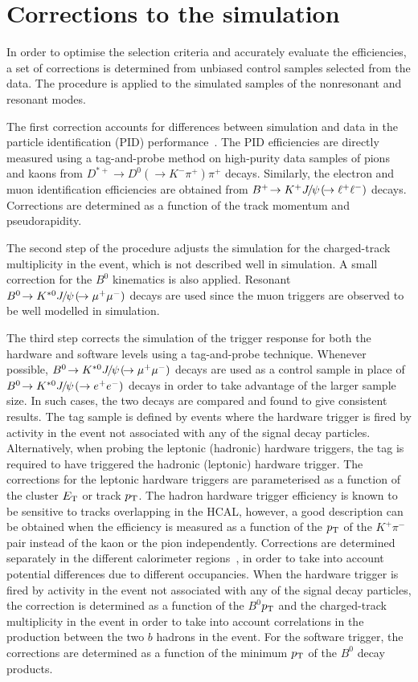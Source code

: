 \documentclass[12pt,a4paper]{article}
\def\Ppi         {\ensuremath{\uppi}\xspace}
\def\Ppsi        {\ensuremath{\uppsi}\xspace}
\def\PB      {\ensuremath{\mathrm{B}}\xspace}
\def\PD      {\ensuremath{\mathrm{D}}\xspace}
\def\PJ      {\ensuremath{\mathrm{J}}\xspace}
\def\PK      {\ensuremath{\mathrm{K}}\xspace}
\def\Pb      {\ensuremath{\mathrm{b}}\xspace}
\def\Pe      {\ensuremath{\mathrm{e}}\xspace}
\def\Ppi         {\ensuremath{\pi}\xspace}
\def\Ppsi        {\ensuremath{\psi}\xspace}
\def\PB      {\ensuremath{B}\xspace}
\def\PD      {\ensuremath{D}\xspace}
\def\PJ      {\ensuremath{J}\xspace}
\def\PK      {\ensuremath{K}\xspace}
\def\Pb      {\ensuremath{b}\xspace}
\def\Pe      {\ensuremath{e}\xspace}
\def\epem       {\ensuremath{\Pe^+\Pe^-}\xspace}
\def\ellm       {\ensuremath{\ell^-}\xspace}
\def\ellp       {\ensuremath{\ell^+}\xspace}
\def\bquark    {\ensuremath{\Pb}\xspace}
\def\pion  {\ensuremath{\Ppi}\xspace}
\def\pip   {\ensuremath{\pion^+}\xspace}
\def\pim   {\ensuremath{\pion^-}\xspace}
\def\kaon  {\ensuremath{\PK}\xspace}
\def\Kp    {\ensuremath{\kaon^+}\xspace}
\def\Km    {\ensuremath{\kaon^-}\xspace}
\def\Kstarz  {\ensuremath{\kaon^{*0}}\xspace}
\def\D       {\ensuremath{\PD}\xspace}
\def\Dz      {\ensuremath{\D^0}\xspace}
\def\Dstarp  {\ensuremath{\D^{*+}}\xspace}
\def\B       {\ensuremath{\PB}\xspace}
\def\Bz      {\ensuremath{\B^0}\xspace}
\def\Bu      {\ensuremath{\B^+}\xspace}
\def\Bd      {\ensuremath{\B^0}\xspace}
\def\jpsi     {\ensuremath{{\PJ\mskip -3mu/\mskip -2mu\Ppsi\mskip 2mu}}\xspace}
\newcommand{\decay}[2]{\ensuremath{#1\!\to #2}\xspace}         \def\ra                 {\ensuremath{\rightarrow}\xspace}
\def\to                 {\ensuremath{\rightarrow}\xspace}
\def\pt         {\mbox{$p_{\rm T}$}\xspace}
\def\et         {\mbox{$E_{\rm T}$}\xspace}
\def\KPi{\ensuremath{\Kp\pim}\xspace}
\def\ll{\ensuremath{\ellp\ellm}\xspace}
\def\BdToKstJPsmm{\mbox{\decay{\Bd}{\Kstarz \jpsi(\decay{}{\mumu})}}\xspace}
\def\BdToKstJPsee{\mbox{\decay{\Bd}{\Kstarz \jpsi(\to\epem)}}\xspace}
\def\BuToKJPsll{\mbox{\decay{\Bu}{\Kp \jpsi(\decay{}{\ll})}}\xspace}
\begin{document}
\section{Corrections to the simulation}
\label{sec:weights}

In order to optimise the selection criteria and accurately evaluate the efficiencies, a set of corrections is determined from unbiased control samples selected from the data.
The procedure is applied to the simulated samples of the nonresonant and resonant modes. 

The first correction accounts for differences between simulation and data in the particle identification (PID) performance~\cite{LHCb-DP-2012-003}.
The PID efficiencies are directly measured using a tag-and-probe method on high-purity data samples of pions and kaons from \mbox{\decay{\Dstarp}{\Dz(\rightarrow \Km \pip)\pip}} decays.
Similarly, the electron and muon identification efficiencies are obtained from \BuToKJPsll decays.
Corrections are determined as a function of the track momentum and pseudorapidity. 

The second step of the procedure adjusts the simulation for the charged-track multiplicity in the event, which is not described well in simulation.
A small correction for the \Bz kinematics is also applied.
Resonant \BdToKstJPsmm decays are used since the muon triggers are observed to be well modelled in simulation.

The third step corrects the simulation of the trigger response for both the hardware and software levels using a tag-and-probe technique.
Whenever possible, \BdToKstJPsmm decays are used as a control sample in place of \BdToKstJPsee decays in order to take advantage of the larger sample size.
In such cases, the two decays are compared and found to give consistent results.
The tag sample is defined by events where the hardware trigger is fired by activity in the event not associated with any of the signal decay particles.
Alternatively, when probing the leptonic (hadronic) hardware triggers, the tag is required to have triggered the hadronic (leptonic) hardware trigger.
The corrections for the leptonic hardware triggers are parameterised as a function of the cluster \et or track \pt.
The hadron hardware trigger efficiency is known to be sensitive to tracks overlapping in the HCAL, however, a good description can be obtained when the efficiency is measured as a function of the \pt of the \KPi pair instead of the kaon or the pion independently.
Corrections are determined separately in the different calorimeter regions~\cite{Alves:2008zz}, in order to take into account potential differences due to different occupancies.
When the hardware trigger is fired by activity in the event not associated with any of the signal decay particles, the correction is determined as a function of the \Bz \pt and the charged-track multiplicity in the event in order to take into account correlations in the production between the two \bquark hadrons in the event.
For the software trigger, the corrections are determined as a function of the minimum \pt of the \Bz decay products. 
\end{document}
